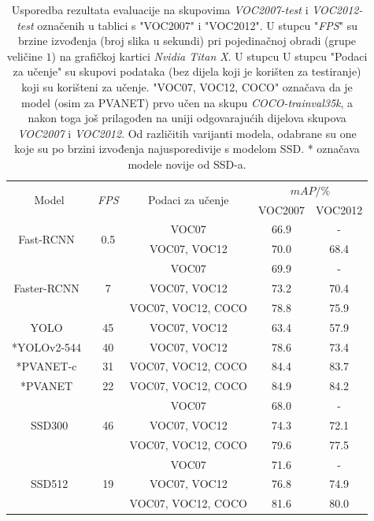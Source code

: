 \documentclass[utf8, seminar, numeric, lmodern]{feri}
\begin{document}
\begin{table}[htbp]
	\centering
	\begin{tabular}{|c|c|c|c|c|}
		\hline
		\multirow{2}{*}{Model} & \multirow{2}{*}{\emph{FPS}} & \multirow{2}{*}{Podaci za učenje} & \multicolumn{2}{c|}{$\textit{mAP}/\%$} \\ \cline{4-5}
		& & & VOC2007 & VOC2012 \\
		\hline
		\multirow{2}{*}{Fast-RCNN~\cite{fastrcnn}} 
		& \multirow{2}{*}{0.5}
		& \footnotesize{VOC07} & 66.9 & - \\ \cline{3-5}
		& & \footnotesize{VOC07, VOC12} & 70.0 & 68.4 \\ \hline
		\multirow{3}{*}{Faster-RCNN~\cite{fasterrcnn}}
		& \multirow{3}{*}{7}
		  & \footnotesize{VOC07} & 69.9 & - \\ \cline{3-5}
		& & \footnotesize{VOC07, VOC12} & 73.2 & 70.4 \\ \cline{3-5}
		& & \footnotesize{VOC07, VOC12, COCO} & 78.8 & 75.9 \\ \hline
		YOLO~\cite{yolov2} & 45 & \footnotesize{VOC07, VOC12} & 63.4 & 57.9 \\ \hline
		*YOLOv2-544~\cite{yolov2} & 40 &  \footnotesize{VOC07, VOC12} & 78.6 & 73.4 \\ \hline
		*PVANET-c~\cite{pvanet} & 31 &  \footnotesize{VOC07, VOC12, COCO} & 84.4 & 83.7 \\ \hline
		*PVANET~\cite{pvanet} & 22 &  \footnotesize{VOC07, VOC12, COCO} & 84.9 & 84.2 \\ \hline
		\multirow{3}{*}{SSD300}
		& \multirow{3}{*}{46}
		  & \footnotesize{VOC07} & 68.0 & - \\ \cline{3-5}
		& & \footnotesize{VOC07, VOC12} & 74.3 & 72.1 \\ \cline{3-5}
		& & \footnotesize{VOC07, VOC12, COCO} & 79.6 & 77.5 \\ \hline
		\multirow{3}{*}{SSD512} 
		& \multirow{3}{*}{19} 
		  & \footnotesize{VOC07} & 71.6 & - \\ \cline{3-5}
		& & \footnotesize{VOC07, VOC12} & 76.8 & 74.9 \\ \cline{3-5}
		& & \footnotesize{VOC07, VOC12, COCO} & 81.6 & 80.0 \\ \hline
	\end{tabular}
	\caption{Usporedba rezultata evaluacije na skupovima \emph{VOC2007-test} i \emph{VOC2012-test} označenih u tablici s "VOC2007" i "VOC2012". U stupcu "\emph{FPS}" su brzine izvođenja (broj slika u sekundi) pri pojedinačnoj obradi (grupe veličine $1$) na grafičkoj kartici \emph{Nvidia Titan X}. U stupcu U stupcu "Podaci za učenje" su skupovi podataka (bez dijela koji je korišten za testiranje) koji su korišteni za učenje. "{\footnotesize{VOC07, VOC12, COCO}}" označava da je model (osim za PVANET) prvo učen na skupu \emph{COCO-trainval35k}, a nakon toga još prilagođen na uniji odgovarajućih dijelova skupova \emph{VOC2007} i \emph{VOC2012}. Od različitih varijanti modela, odabrane su one koje su po brzini izvođenja najusporedivije s modelom SSD. * označava modele novije od SSD-a.\cite{ssd,pvanet,yolov2}}
	\label{tab:rezultati-usporedba-map}
\end{table}
\end{document}
